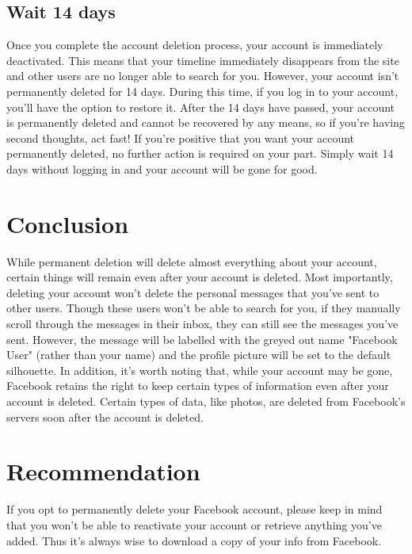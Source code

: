 \documentclass[options]{article}
\begin{document}
\subsection{\textbf{Wait 14 days}} 
Once you complete the account deletion process, your account is immediately deactivated. This means that your timeline immediately disappears from the site and other users are no longer able to search for you. However, your account isn't permanently deleted for 14 days. During this time, if you log in to your account, you'll have the option to restore it. After the 14 days have passed, your account is permanently deleted and cannot be recovered by any means, so if you're having second thoughts, act fast!
If you're positive that you want your account permanently deleted, no further action is required on your part. Simply wait 14 days without logging in and your account will be gone for good.

\section{\textbf{Conclusion}}
While permanent deletion will delete almost everything about your account, certain things will remain even after your account is deleted. Most importantly, deleting your account won't delete the personal messages that you've sent to other users. Though these users won't be able to search for you, if they manually scroll through the messages in their inbox, they can still see the messages you've sent. However, the message will be labelled with the greyed out name "Facebook User" (rather than your name) and the profile picture will be set to the default silhouette.
In addition, it's worth noting that, while your account may be gone, Facebook retains the right to keep certain types of information even after your account is deleted. Certain types of data, like photos, are deleted from Facebook's servers soon after the account is deleted.

\section{\textbf{Recommendation}}
If you opt to permanently delete your Facebook account, please keep in mind that you won't be able to reactivate your account or retrieve anything you've added. Thus it’s always wise to download a copy of your info from Facebook.
\end{document}
